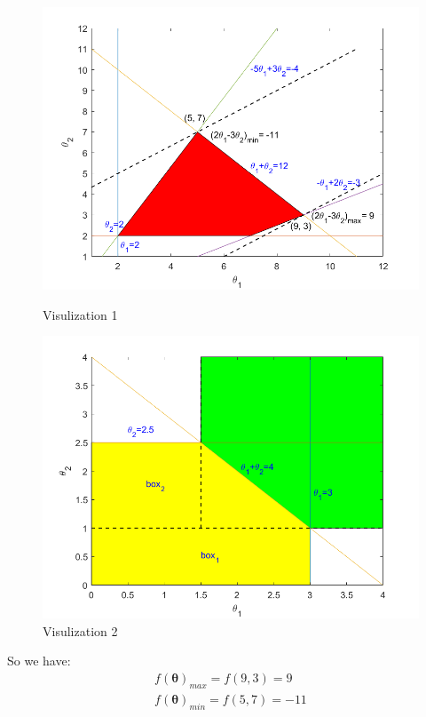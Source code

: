 \documentclass{article}
\begin{document}
\begin{figure}[htbp]
	\centering
	\begin{minipage}{6.7cm}
		\centering
		\includegraphics[scale=0.3]{figure1.png}
		\caption{Visulization 1}
		\label{Problem 1}
	\end{minipage}
	\begin{minipage}{6.7cm}
		\centering
		\includegraphics[scale=0.3]{figure2.png}
		\caption{Visulization 2}
		\label{Problem 2}
	\end{minipage}		
\end{figure}
So we have:
\begin{eqnarray}
f(\bm{\theta})_{max} = f(9,3) = 9\\
f(\bm{\theta})_{min} = f(5,7) = -11
\end{eqnarray}
\end{document}
